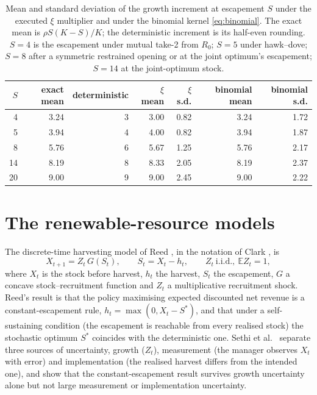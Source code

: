 \begin{table}[ht]
\centering
\caption{Mean and standard deviation of the growth increment at
  escapement \(S\) under the executed \(\xi\) multiplier and under the
  binomial kernel \eqref{eq:binomial}.
  The exact mean is \(\rho S(K-S)/K\); the deterministic increment is its
  half-even rounding.
  \(S=4\) is the escapement under mutual take-2 from \(R_0\); \(S=5\) under
  hawk--dove; \(S=8\) after a symmetric restrained opening or at the joint
  optimum's escapement; \(S=14\) at the joint-optimum stock.}
\label{tab:moments}
\begin{tabular}{rrrrrrr}
\toprule
\(S\) & exact mean & deterministic & \(\xi\) mean & \(\xi\) s.d. & binomial mean & binomial s.d. \\
\midrule
4  & 3.24 & 3 & 3.00 & 0.82 & 3.24 & 1.72 \\
5  & 3.94 & 4 & 4.00 & 0.82 & 3.94 & 1.87 \\
8  & 5.76 & 6 & 5.67 & 1.25 & 5.76 & 2.17 \\
14 & 8.19 & 8 & 8.33 & 2.05 & 8.19 & 2.37 \\
20 & 9.00 & 9 & 9.00 & 2.45 & 9.00 & 2.22 \\
\bottomrule
\end{tabular}
\end{table}

\section{The renewable-resource models}
\label{app:reed}

The discrete-time harvesting model of Reed \cite{reed1979}, in the
notation of Clark \cite{clark1990}, is
\begin{equation}
  X_{t+1}=Z_t\,G(S_t),
  \qquad
  S_t=X_t-h_t,
  \qquad
  Z_t\ \text{i.i.d.},\ \mathbb{E}Z_t=1,
  \label{eq:reed}
\end{equation}
where \(X_t\) is the stock before harvest, \(h_t\) the harvest, \(S_t\)
the escapement, \(G\) a concave stock--recruitment function and \(Z_t\) a
multiplicative recruitment shock.
Reed's result is that the policy maximising expected discounted net
revenue is a constant-escapement rule, \(h_t=\max(0,X_t-S^{*})\), and that
under a self-sustaining condition (the escapement is reachable from every
realised stock) the stochastic optimum \(S^{*}\) coincides with the
deterministic one.
Sethi et al.\ \cite{sethi2005} separate three sources of uncertainty,
growth (\(Z_t\)), measurement (the manager observes \(X_t\) with error) and
implementation (the realised harvest differs from the intended one), and
show that the constant-escapement result survives growth uncertainty alone
but not large measurement or implementation uncertainty.

